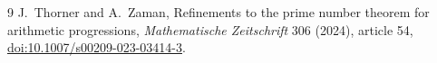 \documentclass[10pt]{article}
\theoremstyle{remark}
\begin{document}
\begin{thebibliography}{9}
J.~Thorner and A.~Zaman,
\newblock Refinements to the prime number theorem for arithmetic progressions,
\newblock \emph{Mathematische Zeitschrift} 306 (2024), article 54,
\newblock \href{https://doi.org/10.1007/s00209-023-03414-3}
{doi:10.1007/s00209-023-03414-3}.
\end{thebibliography}
\end{document}
